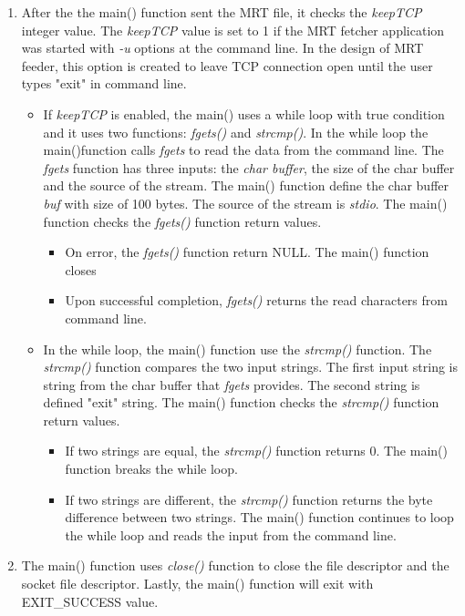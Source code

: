 \begin{enumerate}
\begin{enumerate}
  
  \item{After the the main() function sent the MRT file, it  checks the \emph{keepTCP} integer value.    The \emph{keepTCP} value is set to 1 if  the MRT fetcher application was started with \emph{-u} options at the command line. In the design of MRT feeder, this option is created to leave TCP connection open until the user types "exit" in command line. }
  \begin{itemize}
  \item{If \emph{keepTCP} is enabled, the main() uses a while loop with true condition and it uses  two functions: \emph{fgets()} and \emph{strcmp()}.  In the while loop the main()function calls \emph{fgets} to read the data from the command line.  The \emph{fgets} function has three inputs: the \emph{char buffer}, the size of the char buffer and the source of the stream.  The main() function define the char buffer \emph{buf} with size of 100 bytes. The source of the stream is \emph{stdio}.  The main() function  checks  the \emph{fgets()} function return values.}
  \begin{itemize}
  \item{On error, the \emph{fgets()} function return NULL. The main() function closes}
  \item{Upon successful completion, \emph{fgets()} returns the read characters from command line. }
  \end{itemize}
  \item{In the while loop,  the main() function use the \emph{strcmp()} function. The \emph{strcmp()} function  compares the two input strings. The first input string is string from the char buffer that \emph{fgets} provides. The second string is defined "exit" string.  The main() function checks the \emph{strcmp()} function return values.  }
  \begin{itemize}
    \item{If two strings are equal, the \emph{strcmp()} function returns 0. The main() function breaks the while loop. }
  \item{If two strings are different, the \emph{strcmp()} function returns the byte difference between two strings.  The main() function continues to loop the while loop  and reads the input from the command line.}
  \end{itemize}
  \end{itemize}
  
  \item{The main() function uses \emph{close()} function to close the file descriptor and the socket file descriptor. Lastly, the main() function will exit with EXIT\_SUCCESS value. }
  

\end{enumerate}



\end{enumerate} %


